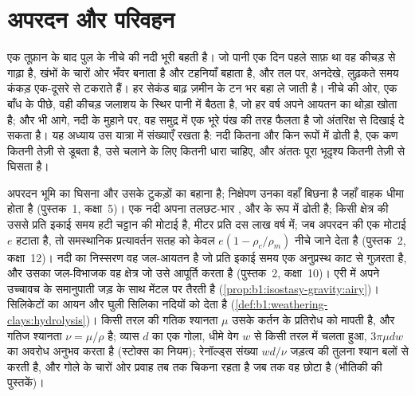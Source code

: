 \chapter{अपरदन और परिवहन}\label{ch:b1:erosion-transport}

एक तूफ़ान के बाद पुल के नीचे की नदी भूरी बहती है। जो पानी एक दिन पहले साफ़ था वह कीचड़ से गाढ़ा है, खंभों के चारों ओर भँवर बनाता है और टहनियाँ बहाता है, और तल पर, अनदेखे, लुढ़कते समय कंकड़ एक-दूसरे से टकराते हैं। हर सेकंड बाढ़ ज़मीन के टन भर बहा ले जाती है। नीचे की ओर, एक बाँध के पीछे, वही कीचड़ जलाशय के स्थिर पानी में बैठता है, जो हर वर्ष अपने आयतन का थोड़ा खोता है; और भी आगे, नदी के मुहाने पर, वह समुद्र में एक भूरे पंख की तरह फैलता है जो अंतरिक्ष से दिखाई दे सकता है। यह अध्याय उस यात्रा में संख्याएँ रखता है: नदी कितना और किन रूपों में ढोती है, एक कण कितनी तेज़ी से डूबता है, उसे चलाने के लिए कितनी धारा चाहिए, और अंततः पूरा भूदृश्य कितनी तेज़ी से घिसता है।

\begin{recall}
अपरदन भूमि का घिसना और उसके टुकड़ों का बहाना है; निक्षेपण उनका वहाँ बिछना है जहाँ वाहक धीमा होता है (पुस्तक~1, कक्षा~5)। एक नदी अपना तलछट-भार ,  और  के रूप में ढोती है; किसी क्षेत्र की  उससे प्रति इकाई समय हटी चट्टान की मोटाई है, मीटर प्रति दस लाख वर्ष में; जब अपरदन  की एक मोटाई $e$ हटाता है, तो समस्थानिक प्रत्यावर्तन सतह को केवल $e(1 - \rho_c/\rho_m)$ नीचे जाने देता है (पुस्तक~2, कक्षा~12)। नदी का निस्सरण वह जल-आयतन है जो प्रति इकाई समय एक अनुप्रस्थ काट से गुज़रता है, और उसका जल-विभाजक वह क्षेत्र जो उसे आपूर्ति करता है (पुस्तक~2, कक्षा~10)। एरी  में  अपने उच्चावच के समानुपाती जड़ के साथ मेंटल पर तैरती है (\cref{prop:b1:isostasy-gravity:airy})। सिलिकेटों का  आयन और घुली सिलिका नदियों को देता है (\cref{def:b1:weathering-clays:hydrolysis})। किसी तरल की गतिक श्यानता $\mu$ उसके कर्तन के प्रतिरोध को मापती है, और गतिज श्यानता $\nu = \mu/\rho$ है; व्यास $d$ का एक गोला, धीमे वेग $w$ से किसी तरल में चलता हुआ, $3\pi\mu d w$ का अवरोध अनुभव करता है (स्टोक्स का नियम); रेनॉल्ड्स संख्या $w d/\nu$ जड़त्व की तुलना श्यान बलों से करती है, और गोले के चारों ओर प्रवाह तब तक चिकना रहता है जब तक वह छोटा है (भौतिकी की पुस्तकें)।
\end{recall}

